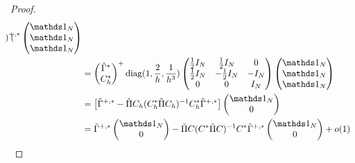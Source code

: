 \begin{proof}
\begin{align*}
\begin{pmatrix}
\end{pmatrix}^{+,*} \begin{pmatrix}\bun_N\\\bun_N\\\bun_N\end{pmatrix}\\
&=\begin{pmatrix}\tilde{\Gamma}^* \\ C_h^*\end{pmatrix}^+
  \diag(1,\frac{2}{h},\frac{1}{h^3})
\begin{pmatrix}\frac{1}{2} I_N & \frac{1}{2} I_N & 0\\ \frac{1}{2}I_N &-\frac{1}{2} I_N & -I_N\\ 0 & 0 &I_N\end{pmatrix}
\begin{pmatrix}\bun_N\\\bun_N\\\bun_N\end{pmatrix}\\
&= \left[\tilde{\Gamma}^{+,*}-\tilde{\Pi}C_h(C_h^*\tilde{\Pi}C_h)^{-1}C_h^*\tilde{\Gamma}^{+,*}\right]\begin{pmatrix}\bun_N\\0\end{pmatrix}\\
&= \tilde{\Gamma}^{+,*}\begin{pmatrix}\bun_N\\0\end{pmatrix}-\tilde{\Pi}C(C^*\tilde{\Pi}C)^{-1}C^*\tilde{\Gamma}^{+,*}\begin{pmatrix}\bun_N\\0\end{pmatrix}+o(1)
\end{align*}
 




\end{proof}
